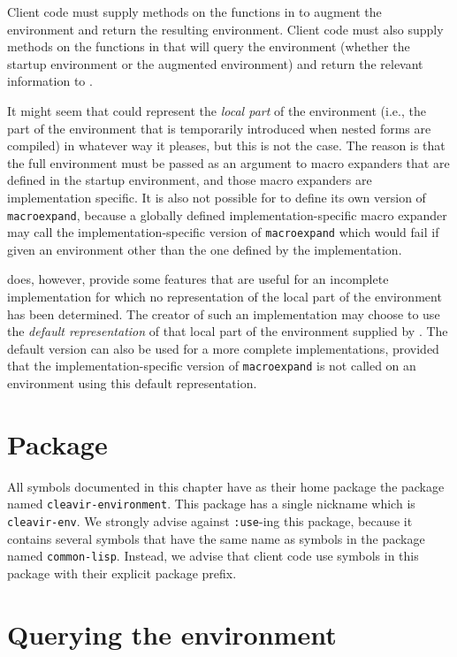 Client code must supply methods on the functions in
 to augment the environment and
return the resulting environment.  Client code must also supply
methods on the functions in  that
will query the environment (whether the startup environment or the
augmented environment) and return the relevant information to
\sysname{}. 

It might seem that \sysname{} could represent the \emph{local part} of
the environment (i.e., the part of the environment that is temporarily
introduced when nested forms are compiled) in whatever way it pleases,
but this is not the case.  The reason is that the full environment
must be passed as an argument to macro expanders that are defined in
the startup environment, and those macro expanders are implementation
specific.  It is also not possible for \sysname{} to define its own
version of \texttt{macroexpand}, because a globally defined
implementation-specific macro expander may call the
implementation-specific version of \texttt{macroexpand} which would
fail if given an environment other than the one defined by the
implementation. 

\sysname{} does, however, provide some features that are useful for an
incomplete implementation for which no representation of the local
part of the environment has been determined.  The creator of such an
implementation may choose to use the \emph{default representation} of
that local part of the environment supplied by \sysname{}.  The
default version can also be used for a more complete implementations,
provided that the implementation-specific version of
\texttt{macroexpand} is not called on an environment using this
default representation.

\section{Package}
\label{sec-environment-package}

All symbols documented in this chapter have as their home package the
package named \texttt{cleavir-environment}.  This package has a single
nickname which is \texttt{cleavir-env}.  We strongly advise against
\texttt{:use}-ing this package, because it contains several symbols
that have the same name as symbols in the package named
\texttt{common-lisp}.  Instead, we advise that client code use symbols
in this package with their explicit package prefix.

\section{Querying the environment}
\label{sec-environment-querying}

